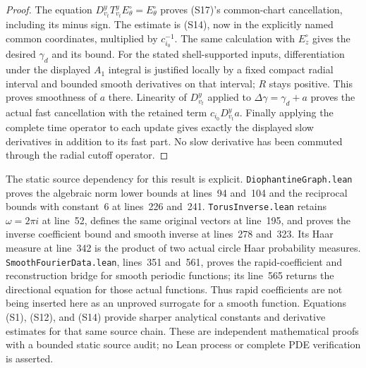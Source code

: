 \begin{proof}
The equation $D_{v_t}^yT_{v_t}^yE_\theta^\circ=E_\theta^\circ$
proves (S17)'s common-chart cancellation, including its minus sign.
The estimate is (S14), now in the explicitly named common
coordinates, multiplied by $c_{i_0}^{-1}$. The same calculation
with $E_z^\circ$ gives the desired $\gamma_d$ and its bound.
For the stated shell-supported inputs, differentiation under the
displayed $A_1$ integral is justified locally by a fixed compact
radial interval and bounded smooth derivatives on that interval;
$R$ stays positive. This proves smoothness of $a$ there.
Linearity of $D_{v_t}^y$ applied to
$\Delta\gamma=\gamma_d+a$ proves the actual fast cancellation
with the retained term $c_{i_0}D_{v_t}^ya$. Finally applying the
complete time operator to each update gives exactly the displayed
slow derivatives in addition to its fast part. No slow derivative
has been commuted through the radial cutoff operator.
\end{proof}

The static source dependency for this result is explicit.
\texttt{DiophantineGraph.lean} proves the algebraic norm lower bounds
at lines~94 and~104 and the reciprocal bounds with constant~6 at
lines~226 and~241. \texttt{TorusInverse.lean} retains
$\omega=2\pi i$ at line~52, defines the same original vectors at
line~195, and proves the inverse coefficient bound and smooth
inverse at lines~278 and~323. Its Haar measure at line~342 is the
product of two actual circle Haar probability measures.
\texttt{SmoothFourierData.lean}, lines~351 and~561, proves the
rapid-coefficient and reconstruction bridge for smooth periodic
functions; its line~565 returns the directional equation for
those actual functions. Thus rapid coefficients are not being
inserted here as an unproved surrogate for a smooth function.
Equations (S1), (S12), and (S14) provide sharper analytical constants
and derivative estimates for that same source chain. These are
independent mathematical proofs with a bounded static source audit;
no Lean process or complete PDE verification is asserted.
